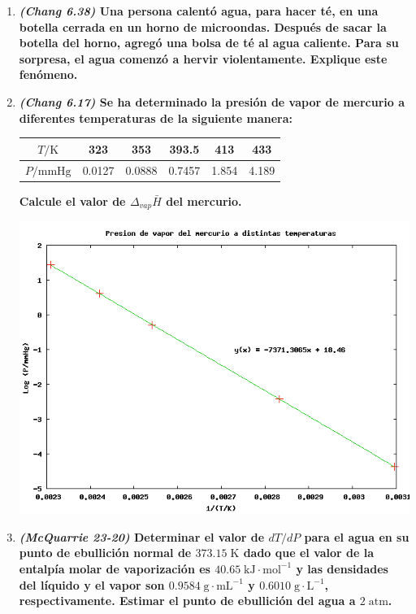 \documentclass[a4paper,12pt]{article}
\begin{document}
\begin{enumerate}
 \item \textbf{\textit{(Chang 6.38)} Una persona calent\'o agua, para hacer t\'e, en una botella cerrada en un horno de microondas. Despu\'es de sacar la botella del horno, agreg\'o una bolsa de t\'e al agua caliente. Para su sorpresa, el agua comenz\'o a hervir violentamente. Explique este fen\'omeno.} %


 \item \textbf{\textit{(Chang 6.17)} Se ha determinado la presi\'on de vapor de mercurio a diferentes temperaturas de la siguiente manera:}

\begin{center}
\begin{tabular}{c | c c c c c}
 $T/\mbox{K}$ & 323 & 353 & 393.5 & 413 & 433 \\\hline
 $P/\mbox{mmHg}$ & 0.0127 & 0.0888 & 0.7457 & 1.854 & 4.189
\end{tabular}
\end{center}

\textbf{Calcule el valor de $\Delta_{vap}\bar{H}$ del mercurio.} %


\begin{center}
 \includegraphics[scale=0.8]{figure8.png}
\end{center}


 \item \textbf{\textit{(McQuarrie 23-20)} Determinar el valor de $dT/dP$ para el agua en su punto de ebullici\'on normal de $373.15\;\mbox{K}$ dado que el valor de la entalp\'ia molar de vaporizaci\'on es $40.65\;\mbox{kJ}\cdot\mbox{mol}^{-1}$ y las densidades del l\'iquido y el vapor son $0.9584\;\mbox{g}\cdot\mbox{mL}^{-1}$ y $0.6010\;\mbox{g}\cdot\mbox{L}^{-1}$, respectivamente. Estimar el punto de ebullici\'on del agua a $2\;\mbox{atm}$.} %


\end{enumerate}
\end{document}
